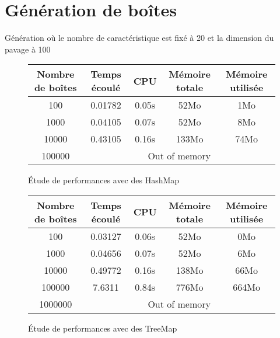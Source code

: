 \chapter{Génération de boîtes}
Génération où le nombre de caractéristique est fixé à 20 et la dimension du pavage à 100
\begin{figure}[h]
  \centering
\begin{tabular}{|c|c|c|c|c|}
\hline
Nombre de boîtes & Temps écoulé & CPU & Mémoire totale & Mémoire utilisée\\
\hline
100 & 0.01782 & 0.05s & 52Mo & 1Mo\\
\hline
1000 & 0.04105 & 0.07s & 52Mo & 8Mo\\
\hline
10000 & 0.43105 & 0.16s & 133Mo & 74Mo\\
\hline
100000 & \multicolumn{4}{|c|}{Out of memory}\\
\hline
\end{tabular}
\caption{Étude de performances avec des HashMap}
\end{figure}



\begin{figure}[h]
  \centering
\begin{tabular}{|c|c|c|c|c|}
\hline
Nombre de boîtes & Temps écoulé & CPU & Mémoire totale & Mémoire utilisée\\
\hline
100 & 0.03127 & 0.06s & 52Mo & 0Mo\\
\hline
1000 & 0.04656 & 0.07s & 52Mo & 6Mo\\
\hline
10000 & 0.49772 & 0.16s & 138Mo & 66Mo\\
\hline
100000 & 7.6311 & 0.84s & 776Mo & 664Mo\\
\hline
1000000 & \multicolumn{4}{|c|}{Out of memory}\\
\hline
\end{tabular}
\caption{Étude de performances avec des TreeMap}
\end{figure}